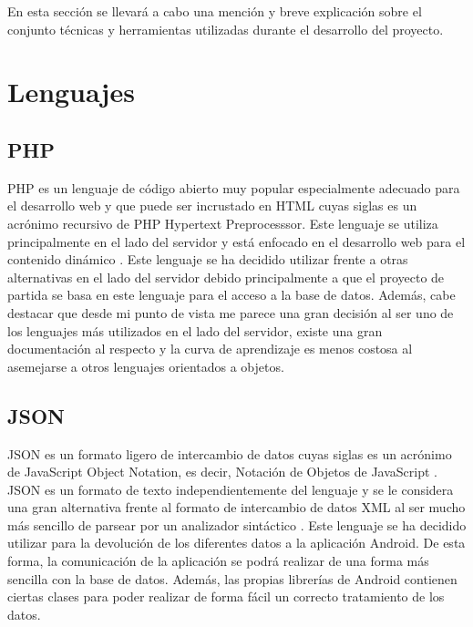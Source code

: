 
En esta sección se llevará a cabo una mención y breve explicación sobre el conjunto técnicas y herramientas utilizadas durante el desarrollo del proyecto.

\section{Lenguajes}

\subsection{PHP}

PHP es un lenguaje de código abierto muy popular especialmente adecuado para el desarrollo web y que puede ser incrustado en HTML \cite{wiki:php} cuyas siglas es un acrónimo recursivo de PHP Hypertext Preprocesssor. Este lenguaje se utiliza principalmente en el lado del servidor y está enfocado en el desarrollo web para el contenido dinámico \cite{wiki:php2}.
Este lenguaje se ha decidido utilizar frente a otras alternativas en el lado del servidor debido principalmente a que el proyecto de partida se basa en este lenguaje para el acceso a la base de datos. Además, cabe destacar que desde mi punto de vista me parece una gran decisión al ser uno de los lenguajes más utilizados en el lado del servidor, existe una gran documentación al respecto y la curva de aprendizaje es menos costosa al asemejarse a otros lenguajes orientados a objetos.

\subsection{JSON}\label{json}

JSON es un formato ligero de intercambio de datos cuyas siglas es un acrónimo de JavaScript Object Notation, es decir, Notación de Objetos de JavaScript \cite{wiki:json}. JSON es un formato de texto independientemente del lenguaje y se le considera una gran alternativa frente al formato de intercambio de datos XML al ser mucho más sencillo de parsear por un analizador sintáctico \cite{wiki:json2}.
Este lenguaje se ha decidido utilizar para la devolución de los diferentes datos a la aplicación Android. De esta forma, la comunicación de la aplicación se podrá realizar de una forma más sencilla con la base de datos. Además, las propias librerías de Android contienen ciertas clases para poder realizar de forma fácil un correcto tratamiento de los datos.

